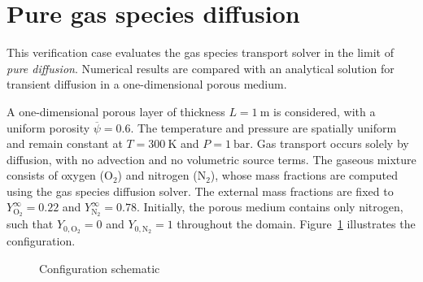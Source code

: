 \documentclass[12pt]{article}
\begin{document}
\fi


\section{Pure gas species diffusion}

This verification case evaluates the gas species transport solver in the limit of \emph{pure diffusion}. Numerical results are compared with an analytical solution for transient diffusion in a one-dimensional porous medium.

A one-dimensional porous layer of thickness $L = 1~\mathrm{m}$ is considered, with a uniform porosity $\overline{\psi}=0.6$. The temperature and pressure are spatially uniform and remain constant at $T=300~\mathrm{K}$ and $P=1~\mathrm{bar}$. Gas transport occurs solely by diffusion, with no advection and no volumetric source terms. The gaseous mixture consists of oxygen (O$_2$) and nitrogen (N$_2$), whose mass fractions are computed using the gas species diffusion solver. The external mass fractions are fixed to $Y_{\mathrm{O_2}}^{\infty}=0.22$ and $Y_{\mathrm{N_2}}^{\infty}=0.78$. Initially, the porous medium contains only nitrogen, such that $Y_{0,\mathrm{O_2}}=0$ and $Y_{0,\mathrm{N_2}}=1$ throughout the domain. Figure~\ref{fig:gas_species_diffusion} illustrates the configuration.


\begin{figure}[H]
\centering
{}
\caption{Configuration schematic}
\label{fig:gas_species_diffusion}
\end{figure}
\end{document}
